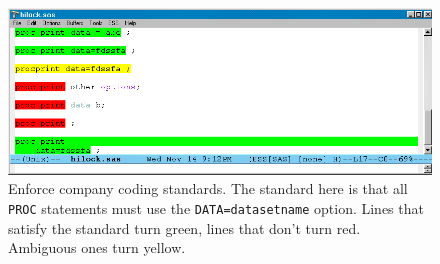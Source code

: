 \documentclass{article}
\newif\ifdraft
\newcommand{\stexttt}[1]{{\small\texttt{#1}}}
\newcommand{\emptyfig}{
\hspace*{42pt}\rule{324pt}{.25pt}\\
\hspace*{42pt}\rule{.25pt}{10pc}
\rule{316pt}{.25pt}
\rule{.25pt}{10pc}}
\begin{document}


\begin{figure}[tbp]
  \centering
  \ifdraft
     \emptyfig
  \else
     \includegraphics[angle=270,width=\textwidth]{hilock-sas}
  \fi
  \caption{Enforce company coding standards.  The standard here is
    that all \stexttt{PROC} statements must use the
    \stexttt{DATA=datasetname} option.  Lines that satisfy the
    standard turn green, lines that don't turn red.
    Ambiguous ones turn yellow.}
  \label{f.hilock}
\end{figure}
\end{document}
